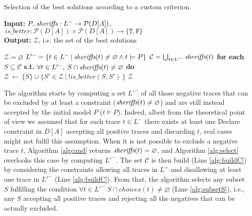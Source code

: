 \begin{algorithm}
    \caption{Selection of the best solutions according to a custom criterion.}
    \label{alg:select}
    \textbf{Input:}  $P,\, \textit{sheriffs} : L^- \rightarrow \mathcal{P}({D[A]})$,$\,{is\_better}:\mathcal{P}({D[A]})\times\mathcal{P}({D[A]})\rightarrow \{\texttt{T},\texttt{F}\}$\\
    \textbf{Output:} $\mathcal{Z}$, i.e. the set of the best solutions
	\begin{algorithmic}[1] 
   	\State $\mathcal{Z}=\varnothing$
  	\State $ L'^- = \{t \in L^- \: | \: \textit{sheriffs}(t) \neq \varnothing \land t\models P\}$
	\State $\mathcal{C} = \bigcup_{t\in L'^-} \textit{sheriffs}(t)$\label{alg:buildC}
	\State \textbf{for each} $S \subseteq \mathcal{C}$ \textbf{s.t.} $\forall t \in L'^-, \; S\cap \textit{sheriffs}(t) \neq \varnothing$ \textbf{do} \label{alg:subsetS}
	\Indent
		 \label{alg:isbetter}
		\State $\mathcal{Z} \, \leftarrow\, \{S\} \cup \{ S'\in\mathcal{Z}\ |\ !is\_better(S,S')\,\}$ \label{alg:previousAreOk}
		\EndIf
	\EndIndent
	\State \Return $\mathcal{Z}$  
    \EndProcedure
    \end{algorithmic}
\end{algorithm}

The algorithm starts by computing a set $L'^-$ of all those negative traces that can be excluded by at least a constraint ($\textit{sheriffs}(t)\neq\varnothing$) and are still instead accepted by the initial model $P$ ($t\models P$). 
Indeed, albeit from the theoretical point of view we assumed that for each trace $t \in L^-$ there exists at least one Declare constraint in $D[A]$ accepting all positive traces and discarding $t$, real cases might not fulfil this assumption.%
When it is not possible to exclude a negative trace $t$, Algorithm \ref{algcand} returns $\textit{sheriffs}(t)=\varnothing$, and Algorithm \ref{alg:select} overlooks this case by computing $L'^-$. 
%
The set $\mathcal{C}$ is then build (Line \ref{alg:buildC}) by considering the constraints allowing all traces in $L^+$ and disallowing at least one trace in $L'^-$ (Line \ref{alg:buildC}). From that, the algorithm selects any subset $S$ fulfilling the condition $\forall t \in L'^- \; S\cap {choices}(t) \neq \varnothing$ (Line \ref{alg:subsetS}), i.e., any $S$ accepting all positive traces and rejecting all the negatives that can be actually excluded.

